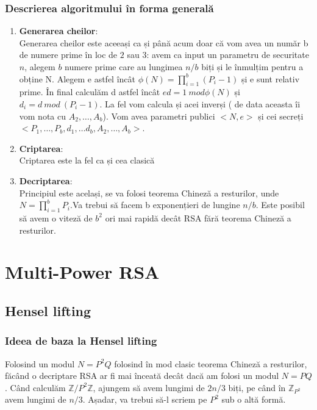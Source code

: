 \documentclass[12pt, oneside]{book}
\begin{document}
		 \subsubsection{Descrierea algoritmului în forma generală}
		 \begin{enumerate}
		 \item \textbf{Generarea cheilor}: \\
		 Generarea cheilor este aceeași ca și până acum doar că vom avea un număr b de numere prime în loc de $2$ sau $3$: avem ca input un parametru de securitate $n$, alegem $b$ numere prime care au lungimea $n/b$ biți și le înmulțim pentru a obține N. Alegem e astfel încât $\phi(N)=\prod_{i=1}^{b}(P_i -1)$ și e sunt relativ prime. În final calculăm d astfel încât $ed=1 \ mod \phi(N)$ și $d_i = d \ mod \ (P_i -1)$. La fel vom calcula și acei inverși ( de data aceasta îi vom nota cu $A_2, \dots ,A_b$). Vom avea parametri publici $<N,e>$ și cei secreți $<P_1, \dots ,P_b,d_1, \dots d_b,A_2, \dots ,A_b>$.
		 
		 \item \textbf{Criptarea}: \\
		 Criptarea este la fel ca și cea clasică
		 \item \textbf{Decriptarea}: \\
		 Principiul este același, se va folosi teorema Chineză a resturilor, unde $N=\prod_{i=1}^{b} P_i$.Va trebui să facem b exponențieri de lungine $n/b$. Este posibil să avem o viteză de $b^2$ ori mai rapidă decât RSA fără teorema Chineză a resturilor.
		 \end{enumerate}
		
		\section{Multi-Power RSA}
		 \subsection{Hensel lifting}
		  \subsubsection{Ideea de baza la Hensel lifting}
		  Folosind un modul $N=P^2Q$ folosind în mod clasic teorema Chineză a resturilor, făcând o decriptare RSA ar fi mai înceată decât dacă am folosi un modul $ N=PQ$. Când calculăm $ \mathbb{Z}/P^2\mathbb{Z}$, ajungem să avem lungimi de $2n/3$ biți, pe când în $\mathbb{Z}_{P^2}$ avem lungimi de $n/3$. Așadar, va trebui să-l scriem pe $P^2$ sub o altă formă.
\end{document}
